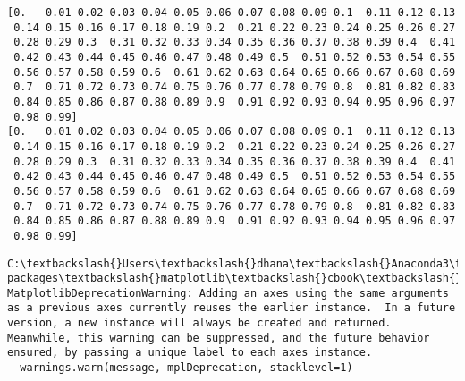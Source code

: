 \documentclass[11pt]{article}
\begin{document}
\begin{Verbatim}[commandchars=\\\{\}]
[0.   0.01 0.02 0.03 0.04 0.05 0.06 0.07 0.08 0.09 0.1  0.11 0.12 0.13
 0.14 0.15 0.16 0.17 0.18 0.19 0.2  0.21 0.22 0.23 0.24 0.25 0.26 0.27
 0.28 0.29 0.3  0.31 0.32 0.33 0.34 0.35 0.36 0.37 0.38 0.39 0.4  0.41
 0.42 0.43 0.44 0.45 0.46 0.47 0.48 0.49 0.5  0.51 0.52 0.53 0.54 0.55
 0.56 0.57 0.58 0.59 0.6  0.61 0.62 0.63 0.64 0.65 0.66 0.67 0.68 0.69
 0.7  0.71 0.72 0.73 0.74 0.75 0.76 0.77 0.78 0.79 0.8  0.81 0.82 0.83
 0.84 0.85 0.86 0.87 0.88 0.89 0.9  0.91 0.92 0.93 0.94 0.95 0.96 0.97
 0.98 0.99]
[0.   0.01 0.02 0.03 0.04 0.05 0.06 0.07 0.08 0.09 0.1  0.11 0.12 0.13
 0.14 0.15 0.16 0.17 0.18 0.19 0.2  0.21 0.22 0.23 0.24 0.25 0.26 0.27
 0.28 0.29 0.3  0.31 0.32 0.33 0.34 0.35 0.36 0.37 0.38 0.39 0.4  0.41
 0.42 0.43 0.44 0.45 0.46 0.47 0.48 0.49 0.5  0.51 0.52 0.53 0.54 0.55
 0.56 0.57 0.58 0.59 0.6  0.61 0.62 0.63 0.64 0.65 0.66 0.67 0.68 0.69
 0.7  0.71 0.72 0.73 0.74 0.75 0.76 0.77 0.78 0.79 0.8  0.81 0.82 0.83
 0.84 0.85 0.86 0.87 0.88 0.89 0.9  0.91 0.92 0.93 0.94 0.95 0.96 0.97
 0.98 0.99]

    \end{Verbatim}

    \begin{Verbatim}[commandchars=\\\{\}]
C:\textbackslash{}Users\textbackslash{}dhana\textbackslash{}Anaconda3\textbackslash{}lib\textbackslash{}site-packages\textbackslash{}matplotlib\textbackslash{}cbook\textbackslash{}deprecation.py:106: MatplotlibDeprecationWarning: Adding an axes using the same arguments as a previous axes currently reuses the earlier instance.  In a future version, a new instance will always be created and returned.  Meanwhile, this warning can be suppressed, and the future behavior ensured, by passing a unique label to each axes instance.
  warnings.warn(message, mplDeprecation, stacklevel=1)

    \end{Verbatim}

    \begin{center}
    \end{center}
    { \hspace*{\fill} \\}
    
    \begin{center}
    \end{center}
    { \hspace*{\fill} \\}
    

    
    
    
    
\end{document}
